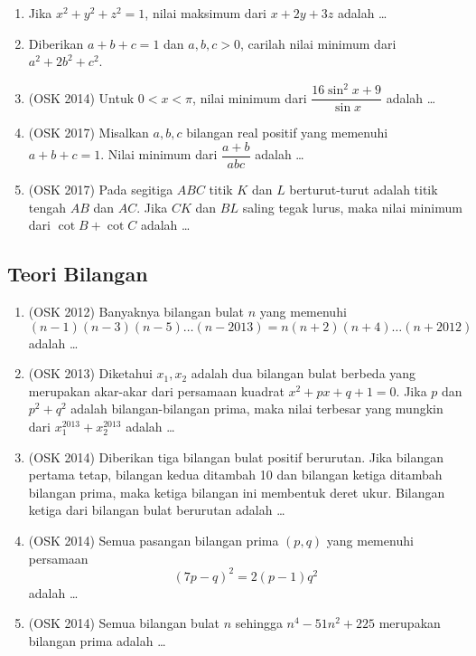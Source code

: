 \begin{enumerate}
        \item Jika $x^2+y^2+z^2=1$, nilai maksimum dari $x+2y+3z$ adalah \dots
        
        \item Diberikan $a+b+c=1$ dan $a,b,c>0$, carilah nilai minimum dari $a^2+2b^2+c^2$.
        
        \item (OSK 2014) Untuk $0 < x < \pi$, nilai minimum dari $\dfrac{16 \sin^2 x + 9}{\sin x}$ adalah \dots
        
        \item (OSK 2017) Misalkan $a,b,c$ bilangan real positif yang memenuhi $a+b+c=1$. Nilai minimum dari $\dfrac{a+b}{abc}$ adalah \dots
        
        \item (OSK 2017) Pada segitiga $ABC$ titik $K$ dan $L$ berturut-turut adalah titik tengah $AB$ dan $AC$. Jika $CK$ dan $BL$ saling tegak lurus, maka nilai minimum dari $\cot B + \cot C$ adalah \dots
    \end{enumerate}
    \subsection{Teori Bilangan}
        \begin{enumerate}
            \item (OSK 2012) Banyaknya bilangan bulat $n$ yang memenuhi $$(n-1)(n-3)(n-5)\dots(n-2013)=n(n+2)(n+4)\dots (n+2012)$$ adalah \dots
            
            \item (OSK 2013) Diketahui $x_1,x_2$ adalah dua bilangan bulat berbeda yang merupakan akar-akar dari persamaan kuadrat $x^2+px+q+1=0$. Jika $p$ dan $p^2+q^2$ adalah bilangan-bilangan prima, maka nilai terbesar yang mungkin dari $x_1^{2013}+x_2^{2013}$ adalah \dots
            
            \item (OSK 2014) Diberikan tiga bilangan bulat positif berurutan. Jika bilangan pertama tetap, bilangan kedua ditambah 10 dan bilangan ketiga ditambah bilangan prima, maka ketiga bilangan ini membentuk deret ukur. Bilangan ketiga dari bilangan bulat berurutan adalah \dots
            
            \item (OSK 2014) Semua pasangan bilangan prima $(p,q)$ yang memenuhi persamaan
            $$(7p-q)^2=2(p-1)q^2$$
            adalah \dots
            
            \item (OSK 2014) Semua bilangan bulat $n$ sehingga $n^4-51n^2+225$ merupakan bilangan prima adalah \dots
        \end{enumerate}
        
